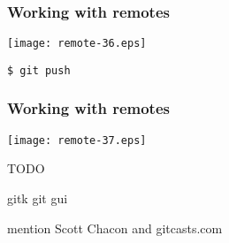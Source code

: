 \documentclass[english]{beamer}
\newcommand{\CMD}[1]{%
\texttt{\textcolor{code-green}{#1}}%
}
\begin{document}
\begin{frame}[fragile]
\frametitle{Working with remotes}

\texttt{[image: remote-36.eps]}

\begin{center}
\CMD{\$ git push}
\end{center}

\vspace{\textheight}
\end{frame}

\begin{frame}[fragile]
\frametitle{Working with remotes}

\texttt{[image: remote-37.eps]}

\vspace{\textheight}
\end{frame}










\begin{frame}
        TODO

gitk
git gui

mention Scott Chacon and gitcasts.com

\end{frame}

\end{document}
